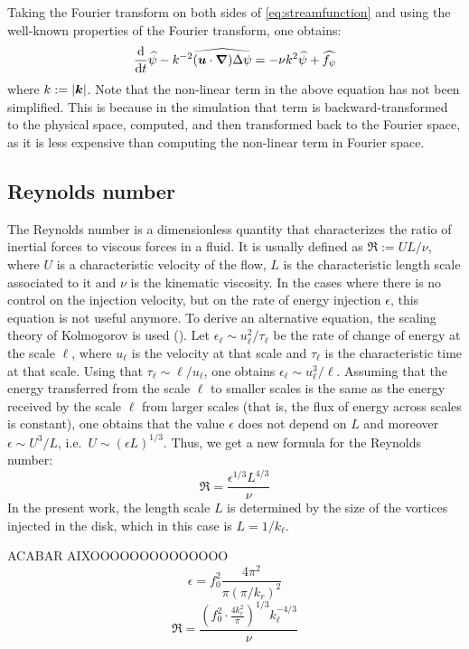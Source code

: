\documentclass[../main.tex]{subfiles}
\begin{document}
Taking the Fourier transform on both sides of \cref{eq:streamfunction} and using the well-known properties of the Fourier transform, one obtains:
\begin{equation}\label{eq:streamfunction_fourier}
	\dv{}{t}\widehat{\psi} - k^{-2} \widehat{(\boldsymbol{u}\cdot \grad) \Delta \psi}= -\nu k^2 \widehat{\psi} + \widehat{f_\psi}
\end{equation}
where $k:=\abs{\boldsymbol{k}}$. Note that the non-linear term in the above equation has not been simplified. This is because in the simulation that term is backward-transformed to the physical space, computed, and then transformed back to the Fourier space, as it is less expensive than computing the non-linear term in Fourier space.

\subsection{Reynolds number}
The Reynolds number is a dimensionless quantity that characterizes the ratio of inertial forces to viscous forces in a fluid. It is usually defined as $\Re:= U L/\nu$, where $U$ is a characteristic velocity of the flow, $L$ is the characteristic length scale associated to it and $\nu$ is the kinematic viscosity. In the cases where there is no control on the injection velocity, but on the rate of energy injection $\epsilon$, this equation is not useful anymore. To derive an alternative equation, the scaling theory of Kolmogorov is used (\cite{Frisch}). Let $\epsilon_\ell \sim u_\ell^2 / \tau_\ell$ be the rate of change of energy at the scale $\ell$, where $u_\ell$ is the velocity at that scale and $\tau_\ell$ is the characteristic time at that scale. Using that $\tau_\ell\sim \ell/u_\ell$, one obtains $\epsilon_\ell \sim u_\ell^3/\ell$. Assuming that the energy transferred from the scale $\ell$ to smaller scales is the same as the energy received by the scale $\ell$ from larger scales (that is, the flux of energy across scales is constant), one obtains that the value $\epsilon$ does not depend on $L$ and moreover $\epsilon \sim U^3/L$, i.e.\ $U \sim {(\epsilon L)}^{1/3}$. Thus, we get a new formula for the Reynolds number:
\begin{equation}
	\Re=\frac{\epsilon^{1/3} L^{4/3}}{\nu}
\end{equation}
In the present work, the length scale $L$ is determined by the size of the vortices injected in the disk, which in this case is $L=1/k_\ell$.

ACABAR AIXOOOOOOOOOOOOOO
\begin{equation}
	\epsilon = f_0^2 \frac{4 \pi^2}{\pi (\pi / k_r)^2}
\end{equation}
\begin{equation}\label{eq:reynolds}
	\Re = \frac{{\left( f_0^2\cdot\frac{4 k_r^2}{\pi} \right)}^{1/3} k_\ell^{-4/3}}{\nu}
\end{equation}
\end{document}
